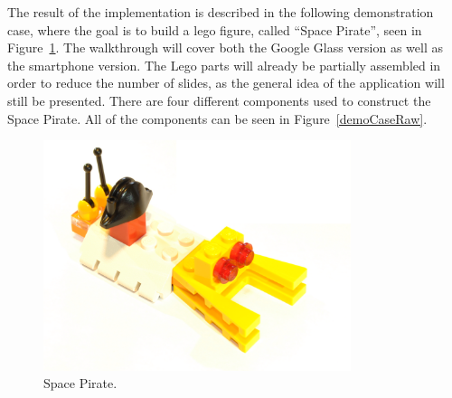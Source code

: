 The result of the implementation is described in the following demonstration case, where the goal is to build a lego figure, called ``Space Pirate'', seen in Figure~\ref{demoCaseGoal}. The walkthrough will cover both the Google Glass version as well as the smartphone version. The Lego parts will already be partially assembled in order to reduce the number of slides, as the general idea of the application will still be presented. There are four different components used to construct the Space Pirate. All of the components can be seen in Figure~\ref{demoCaseRaw}.

	\begin{figure}[H]%
		\centering
		\includegraphics[width=90mm]{images/rawImages/BILD_6}
		\caption{Space Pirate.}
		\label{demoCaseGoal}
	\end{figure}

